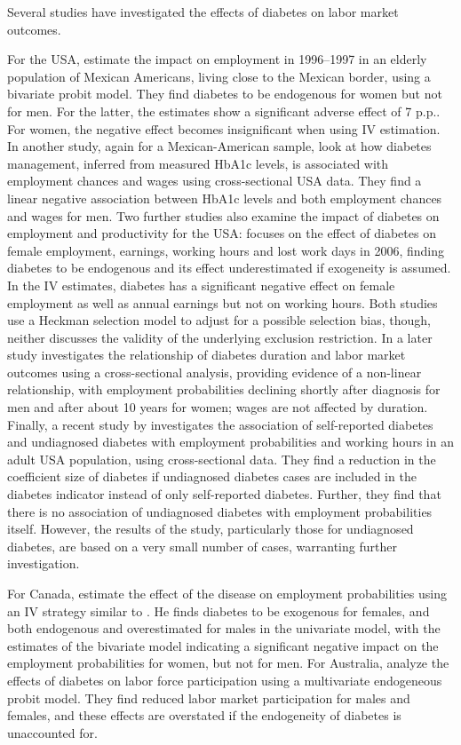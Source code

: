 \documentclass[12pt,english]{article}
\begin{document}
Several studies have investigated the effects of diabetes on labor market outcomes. 

For the \ac{USA}, \textcite{Brown2005} estimate  the impact on employment in 1996--1997 in an elderly population of Mexican Americans, living close to the Mexican border, using a bivariate probit model. They find diabetes to be endogenous for women but not for men.  For the latter, the estimates show a significant adverse effect of 7 \ac{p.p.}. For women, the negative effect becomes insignificant when using \ac{IV} estimation. In another study, again for a Mexican-American sample, \textcite{BrownIII2011} look at how diabetes management, inferred from measured \ac{HbA1c} levels, is associated with employment chances and wages using cross-sectional \ac{USA} data. They find a linear negative association between \ac{HbA1c} levels and both employment chances and wages for men. Two further studies also examine the impact of diabetes on employment and productivity for the \ac{USA}: \textcite{Minor2010} focuses on the effect of diabetes on female employment, earnings, working hours and lost work days in 2006, finding diabetes to be endogenous and its effect underestimated if exogeneity is assumed. In the \ac{IV} estimates, diabetes has a significant negative effect on female employment as well as annual earnings but not on working hours. Both studies use a Heckman selection model to adjust for a possible selection bias, though, neither discusses the validity of the underlying exclusion restriction. In a later study \textcite{Minor2013} investigates the relationship of diabetes duration and labor market outcomes using a cross-sectional analysis, providing evidence of a non-linear relationship, with employment probabilities declining shortly after diagnosis for men and after about 10 years for women; wages are not affected by duration. Finally, a recent study by \parencite{Minor2015} investigates the association of self-reported diabetes and undiagnosed diabetes with employment probabilities and working hours in an adult USA population, using cross-sectional data. They find a reduction in the coefficient size of diabetes if undiagnosed diabetes cases are included in the diabetes indicator instead of only self-reported diabetes. Further, they find that there is no association of undiagnosed diabetes with employment probabilities itself. However, the results of the study, particularly those for undiagnosed diabetes, are based on a very small number of cases, warranting further investigation.

For Canada, \textcite{Latif2009} estimate the effect of the disease on employment probabilities using an \ac{IV} strategy similar to \textcite{Brown2005}. He finds diabetes to be exogenous for females, and both endogenous and overestimated for males in the univariate model, with the estimates of the bivariate model indicating a significant negative impact on the employment probabilities for women, but not for men. For Australia, \textcite{Zhang2009} analyze the effects of diabetes on labor force participation using a multivariate endogeneous probit model. They find reduced labor market participation for males and females, and these effects are overstated if the endogeneity of diabetes is unaccounted for. 
\end{document}
